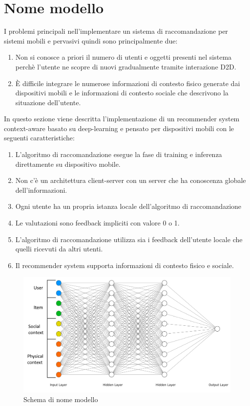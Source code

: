 \documentclass[12pt,italian]{report}
\begin{document}
\section{Nome modello}
I problemi principali nell'implementare un sistema di raccomandazione per sistemi mobili e pervasivi quindi sono principalmente due:
\begin{enumerate}
 \item Non si conosce a priori il numero di utenti e oggetti presenti nel sistema perchè l'utente ne scopre di nuovi gradualmente tramite interazione D2D.
 \item \`E difficile integrare le numerose informazioni di contesto fisico generate dai dispositivi mobili e le informazioni di contesto sociale che descrivono la situazione dell'utente.
\end{enumerate}
In questo sezione viene descritta l'implementazione di un recommender system context-aware basato su deep-learning e pensato per dispositivi mobili con le seguenti caratteristiche:
\begin{enumerate}
 \item L'algoritmo di raccomandazione esegue la fase di training e inferenza direttamente su dispositivo mobile.
 \item Non c'è un architettura client-server con un server che ha conoscenza globale dell'informazioni.
 \item Ogni utente ha un propria istanza locale dell'algoritmo di raccomandazione
 \item Le valutazioni sono feedback impliciti con valore 0 o 1.
 \item L'algoritmo di raccomandazione utilizza sia i feedback dell'utente locale che quelli ricevuti da altri utenti.
 \item Il recommender system supporta informazioni di contesto fisico e sociale.
\end{enumerate}

\begin{figure}
  \includegraphics[width=\linewidth]{immagini/ffnet_schema.png}
  \caption{Schema di nome modello}
  \label{fig:curse-dim}
\end{figure}
\end{document}
